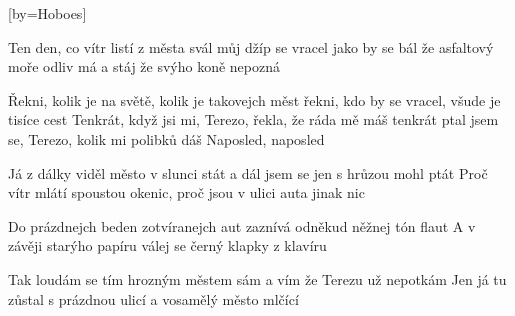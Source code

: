 [by={Hoboes}]

\beginverse{}
Ten den, co vítr listí z města svál
můj džíp se vracel jako by se bál
že asfaltový moře odliv má a stáj že svýho koně nepozná
\endverse{}

\beginchorus{}
Řekni, kolik je na světě, kolik je takovejch měst
řekni, kdo by se vracel, všude je tisíce cest
Tenkrát, když jsi mi, Terezo, řekla, že ráda mě máš
tenkrát ptal jsem se, Terezo, kolik mi polibků dáš
Naposled, naposled
\endchorus{}

\beginverse{}
Já z dálky viděl město v slunci stát
a dál jsem se jen s hrůzou mohl ptát
Proč vítr mlátí spoustou okenic, proč jsou v ulici auta jinak nic
\endverse{}

\beginchorus{}

\endchorus{}

\beginverse{}
Do prázdnejch beden zotvíranejch aut
zaznívá odněkud něžnej tón flaut
A v závěji starýho papíru válej se černý klapky z klavíru
\endverse{}

\beginchorus{}

\endchorus{}

\beginverse{}
Tak loudám se tím hrozným městem sám
a vím že Terezu už nepotkám
Jen já tu zůstal s prázdnou ulicí a vosamělý město mlčící
\endverse{}

\beginchorus{}

\endchorus{}

\endsong{}
